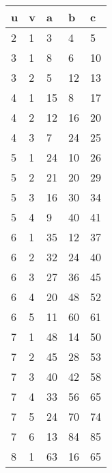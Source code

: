 \documentclass[letterpaper, 12pt]{article}
\theoremstyle{mystyle}
\begin{document}
\begin{tabular}{l l l l l}
    u   & v   & a   & b   & c   \\
    \hline
    2 & 1 & 3 & 4 & 5 \\
    3 & 1 & 8 & 6 & 10 \\
    3 & 2 & 5 & 12 & 13 \\
    4 & 1 & 15 & 8 & 17 \\
    4 & 2 & 12 & 16 & 20 \\
    4 & 3 & 7 & 24 & 25 \\
    5 & 1 & 24 & 10 & 26 \\
    5 & 2 & 21 & 20 & 29 \\
    5 & 3 & 16 & 30 & 34 \\
    5 & 4 & 9 & 40 & 41 \\
    6 & 1 & 35 & 12 & 37 \\
    6 & 2 & 32 & 24 & 40 \\
    6 & 3 & 27 & 36 & 45 \\
    6 & 4 & 20 & 48 & 52 \\
    6 & 5 & 11 & 60 & 61 \\
    7 & 1 & 48 & 14 & 50 \\
    7 & 2 & 45 & 28 & 53 \\
    7 & 3 & 40 & 42 & 58 \\
    7 & 4 & 33 & 56 & 65 \\
    7 & 5 & 24 & 70 & 74 \\
    7 & 6 & 13 & 84 & 85 \\
    8 & 1 & 63 & 16 & 65 \\
\end{tabular}
\quad
\end{document}
